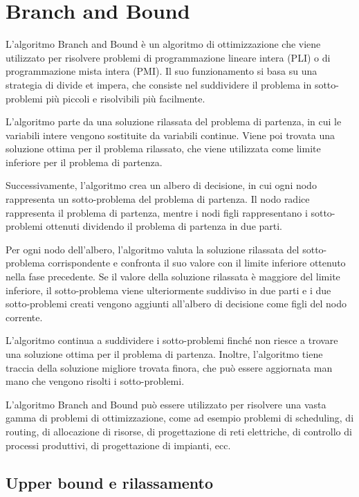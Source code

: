 \chapter{Branch and Bound}

L'algoritmo Branch and Bound è un algoritmo di ottimizzazione che viene utilizzato per risolvere problemi di programmazione lineare intera (PLI) o di programmazione mista intera (PMI). Il suo funzionamento si basa su una strategia di divide et impera, che consiste nel suddividere il problema in sotto-problemi più piccoli e risolvibili più facilmente.

L'algoritmo parte da una soluzione rilassata del problema di partenza, in cui le variabili intere vengono sostituite da variabili continue. Viene poi trovata una soluzione ottima per il problema rilassato, che viene utilizzata come limite inferiore per il problema di partenza.

Successivamente, l'algoritmo crea un albero di decisione, in cui ogni nodo rappresenta un sotto-problema del problema di partenza. Il nodo radice rappresenta il problema di partenza, mentre i nodi figli rappresentano i sotto-problemi ottenuti dividendo il problema di partenza in due parti.

Per ogni nodo dell'albero, l'algoritmo valuta la soluzione rilassata del sotto-problema corrispondente e confronta il suo valore con il limite inferiore ottenuto nella fase precedente. Se il valore della soluzione rilassata è maggiore del limite inferiore, il sotto-problema viene ulteriormente suddiviso in due parti e i due sotto-problemi creati vengono aggiunti all'albero di decisione come figli del nodo corrente.

L'algoritmo continua a suddividere i sotto-problemi finché non riesce a trovare una soluzione ottima per il problema di partenza. Inoltre, l'algoritmo tiene traccia della soluzione migliore trovata finora, che può essere aggiornata man mano che vengono risolti i sotto-problemi.

L'algoritmo Branch and Bound può essere utilizzato per risolvere una vasta gamma di problemi di ottimizzazione, come ad esempio problemi di scheduling, di routing, di allocazione di risorse, di progettazione di reti elettriche, di controllo di processi produttivi, di progettazione di impianti, ecc.

\section{Upper bound e rilassamento}

